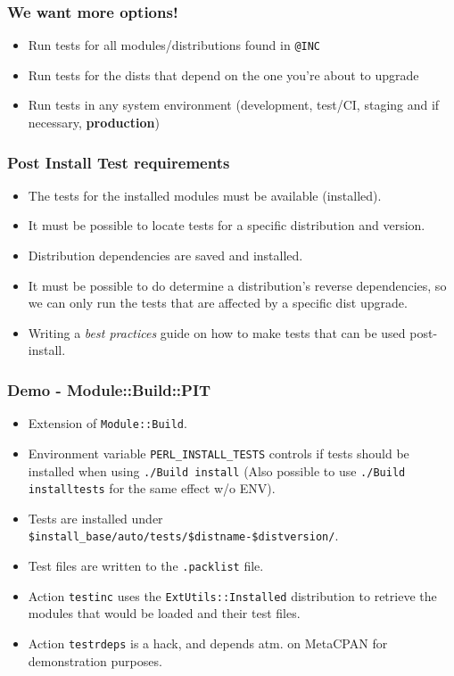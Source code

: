 \documentclass[10pt]{beamer}
\begin{document}
\begin{frame}[fragile]
\frametitle{We want more options!}
\begin{itemize}
\item Run tests for all modules/distributions found in \verb|@INC|
\item Run tests for the dists that depend on the one you're about to upgrade
\item Run tests in any system environment (development, test/CI, staging and if necessary, {\bf production})
\end{itemize}
\end{frame}

\begin{frame}
\frametitle{Post Install Test requirements}
\begin{itemize}
\item The tests for the installed modules must be available (installed).
\item It must be possible to locate tests for a specific distribution and version.
\item Distribution dependencies are saved and installed.
\item It must be possible to do determine a distribution's reverse dependencies, so we can only run the tests that are affected by a specific dist upgrade.
\item Writing a \emph{best practices} guide on how to make tests that can be used post-install.
\end{itemize}
\end{frame}

\begin{frame}[fragile]
\frametitle{Demo - Module::Build::PIT}
\begin{itemize}
\item Extension of \verb|Module::Build|.
\item Environment variable \verb|PERL_INSTALL_TESTS| controls if tests should be installed when using  \verb|./Build install| (Also possible to use \verb|./Build installtests| for the same effect w/o ENV).
\item Tests are installed under \verb|$install_base/auto/tests/$distname-$distversion/|.
\item Test files are written to the \verb|.packlist| file.
\item Action \verb|testinc| uses the \verb|ExtUtils::Installed| distribution to retrieve the modules that would be loaded and their test files.
\item Action \verb|testrdeps| is a hack, and depends atm. on MetaCPAN for demonstration purposes.
\end{itemize}
\end{frame}
\end{document}
